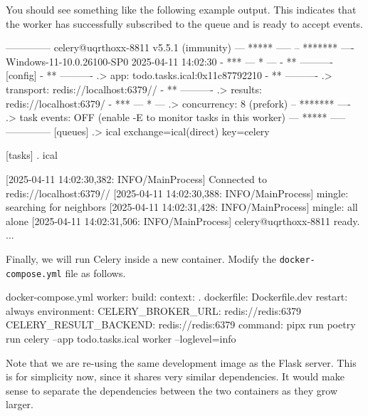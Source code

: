 \documentclass{csse4400}
\begin{document}

\noindent
You should see something like the following example output.
This indicates that the worker has successfully subscribed to the queue and is ready to accept events.
%
\begin{code}[numbers=none]{}
 -------------- celery@uqrthoxx-8811 v5.5.1 (immunity)
--- ***** -----
-- ******* ---- Windows-11-10.0.26100-SP0 2025-04-11 14:02:30
- *** --- * ---
- ** ---------- [config]
- ** ---------- .> app:         todo.tasks.ical:0x11c87792210
- ** ---------- .> transport:   redis://localhost:6379//
- ** ---------- .> results:     redis://localhost:6379/
- *** --- * --- .> concurrency: 8 (prefork)
-- ******* ---- .> task events: OFF (enable -E to monitor tasks in this worker)
--- ***** -----
 -------------- [queues]
                .> ical             exchange=ical(direct) key=celery


[tasks]
  . ical

[2025-04-11 14:02:30,382: INFO/MainProcess] Connected to redis://localhost:6379//
[2025-04-11 14:02:30,388: INFO/MainProcess] mingle: searching for neighbors
[2025-04-11 14:02:31,428: INFO/MainProcess] mingle: all alone
[2025-04-11 14:02:31,506: INFO/MainProcess] celery@uqrthoxx-8811 ready.
...
\end{code}

\noindent
Finally, we will run Celery inside a new container.
Modify the \texttt{docker-compose.yml} file as follows.

\vspace{-1em}
\begin{code}[numbers=none]{docker-compose.yml}
  worker:
    build:
      context: .
      dockerfile: Dockerfile.dev
    restart: always
    environment:
      CELERY_BROKER_URL: redis://redis:6379
      CELERY_RESULT_BACKEND: redis://redis:6379
    command: pipx run poetry run celery --app todo.tasks.ical worker --loglevel=info
\end{code}

Note that we are re-using the same development image as the Flask server.
This is for simplicity now, since it shares very similar dependencies.
It would make sense to separate the dependencies between the two containers as they grow larger.
\end{document}
